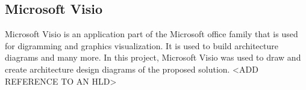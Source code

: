 \subsection{Microsoft Visio}
\label{subsec:ms-visio}
Microsoft Visio is an application part of the Microsoft office family that is used for digramming and graphics visualization. It is used to build architecture diagrams and many more. In this project, Microsoft Visio was used to draw and create architecture design diagrams of the proposed solution.
<ADD REFERENCE TO AN HLD>


